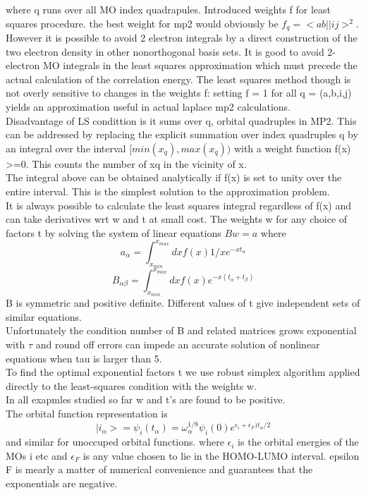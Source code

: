 \documentclass[10pt, draft]{article}
\begin{document}
where q runs over all MO index quadrapules.  Introduced weights f for least squares procedure.  the best weight for mp2 would obviously be $f_q = <ab || ij>^2$.  However it is possible to avoid 2 electron integrals by a direct construction of the two electron density in other nonorthogonal basis sets.  It is good to avoid 2-electron MO integrals in the least squares approximation which must precede the actual calculation of the correlation energy.  The least squares method though is not overly sensitive to changes in the weights f: setting f = 1 for all q = (a,b,i,j) yields an approximation useful in actual laplace mp2 calculations.  \\
Disadvantage of LS condittion is it sums over q, orbital quadruples in MP2.  This can be addressed by replacing the explicit summation over index quadruples q by an integral over the interval $[min(x_q), max(x_q))$ with a weight function f(x) >=0. This counts the number of xq in the vicinity of x.  \\
The integral above can be obtained analytically if f(x) is set to unity over the entire interval.  This is the simplest solution to the approximation problem. \\
It is always possible to calculate the least squares integral regardless of f(x) and can take derivatives wrt w and t at small cost.  The weights w for any choice of factors t by solving the system of linear equations $Bw=a$ where 
\[a_\alpha = \int_{x_{min}}^{x_{max}} dx f(x) 1/x e^{-xt_\alpha} \]
\[B_{\alpha \beta} = \int_{x_{min}} ^{x_{max}} dx f(x) e^{-x(t_\alpha + t_\beta)}\]
B is symmetric and positive definite.  Different values of t give independent sets of similar equations.  \\
Unfortunately the condition number of B and related matrices grows exponential with $\tau$ and round off errors can impede an accurate solution of nonlinear equations when tau is larger than 5.\\
To find the optimal exponential factors t we use robust simplex algorithm applied directly to the least-squares condition with the weights w. \\
In all exapmles studied so far w and t's are found to be positive.  \\
The orbital function representation is 
\[|i_\alpha> = \psi_i(t_\alpha) = \omega_\alpha^{1/8} \psi_i(0) e^{\epsilon_i + \epsilon_F)t_\alpha/2}\]
and similar for unoccuped orbital functions. where $\epsilon_i$ is the orbital energies of the MOs i etc and $\epsilon_F$ is any value chosen to lie in the HOMO-LUMO interval.  epsilon F is mearly a matter of numerical convenience and guarantees that the exponentials are negative.  
\end{document}
